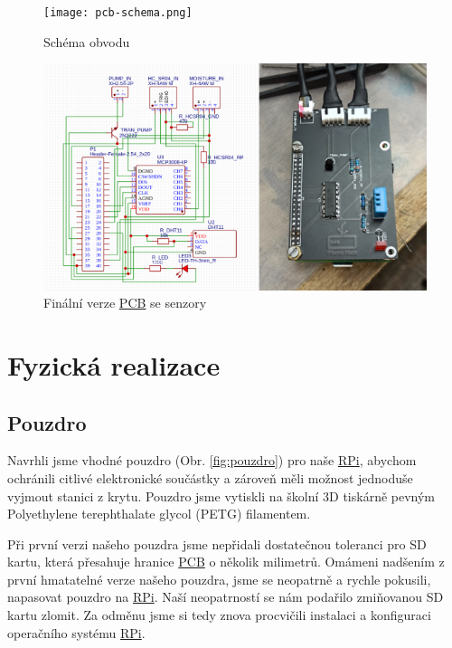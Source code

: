 \documentclass[czech,12pt,a4paper]{article}
\begin{document}
\vspace*{2cm}
\begin{figure}[h]
	\begin{minipage}[t]{0.5\linewidth}
		\texttt{[image: pcb-schema.png]}
		\caption{Schéma obvodu}
		\label{fig:schema-obvodu}
	\end{minipage}
	\hfill
	\begin{minipage}[t]{0.5\linewidth}
		\includegraphics[width=\linewidth]{pcb.png}
		\caption{Finální verze \underline{\ac{PCB}} se senzory}
		\label{fig:finalni-verze}
	\end{minipage}
\end{figure}

\clearpage

\section{Fyzická realizace} \label{secRealizace}

\subsection{Pouzdro}

Navrhli jsme vhodné pouzdro (Obr. \ref{fig:pouzdro}) pro naše \underline{\ac{RPi}}, abychom ochránili citlivé elektronické součástky a zároveň měli možnost jednoduše vyjmout stanici z krytu. Pouzdro jsme vytiskli na školní 3D tiskárně pevným Polyethylene terephthalate glycol (PETG) filamentem.

Při první verzi našeho pouzdra jsme nepřidali dostatečnou toleranci pro SD kartu, která přesahuje hranice \underline{\ac{PCB}} o několik milimetrů. Omámeni nadšením z první hmatatelné verze našeho pouzdra, jsme se neopatrně a rychle pokusili, napasovat pouzdro na \underline{\ac{RPi}}. Naší neopatrností se nám podařilo zmiňovanou SD kartu zlomit. Za odměnu jsme si tedy znova procvičili instalaci a konfiguraci operačního systému \underline{\ac{RPi}}.
\end{document}
